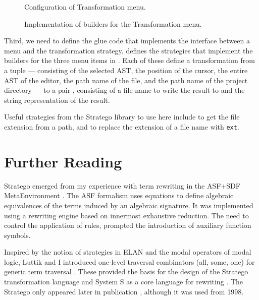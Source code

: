 \begin{figure}[t]

\caption{Configuration of Transformation menu.}
\end{figure}

\begin{figure}[t]

\caption{Implementation of builders for the Transformation menu.}
\end{figure}

Third, we need to define the glue code that implements the interface between a
menu and the transformation strategy. 
defines the strategies that implement the builders for the three menu items in
. Each of these define a transformation
from a tuple  ---
consisting of the selected AST, the position of the cursor, the entire AST of
the editor, the path name of the file, and the path name of the project
directory --- to a pair , consisting of a file name
to write the result to and the string representation of the result.

Useful strategies from the Stratego library to use here include
 to get the file extension from a path, and
 to replace the extension of a file name with
\texttt{ext}.


\section{Further Reading}

Stratego emerged from my experience with term rewriting in the ASF+SDF
MetaEnvironment \cite{Klint93,BrandDHJJKKMOSVVV01}. The ASF formalism uses
equations to define algebraic equivalences of the terms induced by an algebraic
signature. It was implemented using a rewriting engine based on innermost
exhaustive reduction. The need to control the application of rules, prompted the
introduction of auxiliary function symbols. 

Inspired by the notion of strategies in ELAN
\cite{BorovanskyKKMV96,BorovanskyKKMR98} and the modal operators of modal logic,
Luttik and I introduced one-level traversal combinators (all, some, one) for
generic term traversal \cite{LV97}.
These provided the basis for the design of the Stratego transformation language
\cite{VisserBT98} and System S as a core language for rewriting
\cite{VisserB98}. The Stratego only appeared later in publication
\cite{Visser01}, although it was used from 1998.

